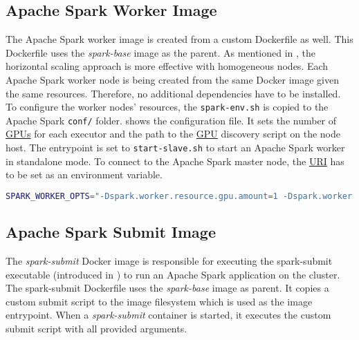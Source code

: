 \subsection{Apache Spark Worker Image}
The Apache Spark worker image is created from a custom Dockerfile as well.
%
This Dockerfile uses the \textit{spark-base} image as the parent.
As mentioned in , the horizontal scaling approach is more effective with homogeneous nodes. Each Apache Spark worker node is being created from the same Docker image given the same resources.
%
Therefore, no additional dependencies have to be installed.
%
To configure the worker nodes' resources, the \texttt{spark-env.sh} is copied to the Apache Spark \texttt{conf/} folder.  shows the configuration file. It sets the number of \hyperlink{abbr:gpu}{GPUs} for each executor and the path to the \hyperlink{abbr:gpu}{GPU} discovery script on the node host.
%
The entrypoint is set to \texttt{start-slave.sh} to start an Apache Spark worker in standalone mode. To connect to the Apache Spark master node, the \hyperlink{abbr:uri}{URI} has to be set as an environment variable.
\begin{lstlisting}[label=lst:06_env_depl_worker-env, caption=Environment configuration for all worker nodes, language=sh, numbers=none]
SPARK_WORKER_OPTS="-Dspark.worker.resource.gpu.amount=1 -Dspark.worker.resource.gpu.discoveryScript=/opt/sparkRapidsPlugin/getGpusResources.sh"
\end{lstlisting}


\subsection{Apache Spark Submit Image}
The \textit{spark-submit} Docker image is responsible for executing the spark-submit executable (introduced in ) to run an Apache Spark application on the cluster.
The spark-submit Dockerfile uses the \textit{spark-base} image as parent.
It copies a custom submit script to the image filesystem which is used as the image entrypoint. When a \textit{spark-submit} container is started, it executes the custom submit script with all provided arguments.


